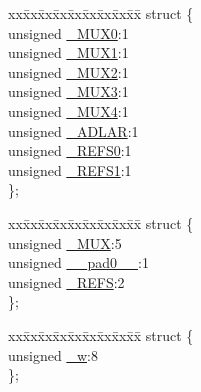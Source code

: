 \begin{DoxyCompactItemize}
\item 
\begin{tabbing}
xx\=xx\=xx\=xx\=xx\=xx\=xx\=xx\=xx\=\kill
struct \{\\
\>unsigned \hyperlink{union_____a_d_m_u_xbits__t_a4d3f3465c2e3e962a61fa8dd277f3e05}{\_MUX0}:1\\
\>unsigned \hyperlink{union_____a_d_m_u_xbits__t_adad9ba63c570c7c4fd9fb3f76b29a089}{\_MUX1}:1\\
\>unsigned \hyperlink{union_____a_d_m_u_xbits__t_a4ea06c988aeef1bac45de09106cfc509}{\_MUX2}:1\\
\>unsigned \hyperlink{union_____a_d_m_u_xbits__t_ab27ebfff043ae8dd982dd7527089a43d}{\_MUX3}:1\\
\>unsigned \hyperlink{union_____a_d_m_u_xbits__t_a9d35776a58434d59d4ede7459128875a}{\_MUX4}:1\\
\>unsigned \hyperlink{union_____a_d_m_u_xbits__t_aa754fb5ce7316d73aa845c8a871c9d9f}{\_ADLAR}:1\\
\>unsigned \hyperlink{union_____a_d_m_u_xbits__t_acde77705271f7e98bde7bff3c2d28e8a}{\_REFS0}:1\\
\>unsigned \hyperlink{union_____a_d_m_u_xbits__t_af3ccbaeb688b8b7848b8b020b8506fc0}{\_REFS1}:1\\
\}; \\

\end{tabbing}\item 
\begin{tabbing}
xx\=xx\=xx\=xx\=xx\=xx\=xx\=xx\=xx\=\kill
struct \{\\
\>unsigned \hyperlink{union_____a_d_m_u_xbits__t_ad17d75c029c93f0b1505ac191bc915f0}{\_MUX}:5\\
\>unsigned \hyperlink{union_____a_d_m_u_xbits__t_ad654d8d38390c97eb1d1f925029308f8}{\_\_pad0\_\_}:1\\
\>unsigned \hyperlink{union_____a_d_m_u_xbits__t_a0b409640eeea6166e1a035446ede13e9}{\_REFS}:2\\
\}; \\

\end{tabbing}\item 
\begin{tabbing}
xx\=xx\=xx\=xx\=xx\=xx\=xx\=xx\=xx\=\kill
struct \{\\
\>unsigned \hyperlink{union_____a_d_m_u_xbits__t_ad95dd7acd8493ebcad2dfa8e8a6d79b8}{\_w}:8\\
\}; \\

\end{tabbing}\end{DoxyCompactItemize}


